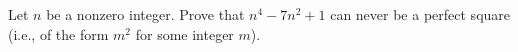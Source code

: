 Let $n$ be a nonzero integer. Prove that $n^4 - 7n^2 + 1$ can never be a
perfect square (i.e., of the form $m^2$ for some integer $m$).
